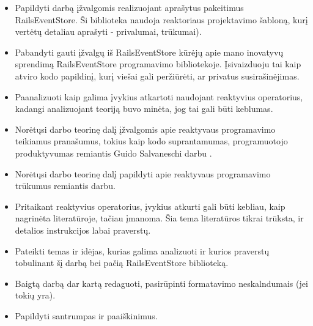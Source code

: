 \begin{itemize}
  \item Papildyti darbą įžvalgomis realizuojant aprašytus pakeitimus RailsEventStore. Ši biblioteka naudoja reaktoriaus projektavimo šabloną, kurį vertėtų detaliau aprašyti - privalumai, trūkumai).

  \item Pabandyti gauti įžvalgų iš RailsEventStore kūrėjų apie mano inovatyvų sprendimą RailsEventStore programavimo bibliotekoje. Įsivaizduoju tai kaip atviro kodo papildinį, kurį viešai gali peržiūrėti, ar privatus susirašinėjimas.

  \item Paanalizuoti kaip galima įvykius atkartoti naudojant reaktyvius operatorius, kadangi analizuojant teoriją buvo minėta, jog tai gali būti keblumas.

  \item Norėtųsi darbo teorinę dalį įžvalgomis apie reaktyvaus programavimo teikiamus pranašumus, tokius kaip kodo suprantamumas, programuotojo produktyvumas remiantis Guido Salvaneschi darbu \cite{Salvaneschi:2014:ESP:2635868.2635895}.

  \item Norėtųsi darbo teorinę dalį papildyti apie reaktyvaus programavimo trūkumus remiantis \cite{Bainomugisha:2013:SRP:2501654.2501666} darbu.

  \item Pritaikant reaktyvius operatorius, įvykius atkurti gali būti kebliau, kaip nagrinėta literatūroje, tačiau įmanoma. Šia tema literatūros tikrai trūksta, ir detalios instrukcijos labai praverstų.

  \item Pateikti temas ir idėjas, kurias galima analizuoti ir kurios praverstų tobulinant šį darbą bei pačią RailsEventStore biblioteką.

  \item Baigtą darbą dar kartą redaguoti, pasirūpinti formatavimo neskalndumais (jei tokių yra).

  \item Papildyti santrumpas ir paaiškinimus.
\end{itemize}
